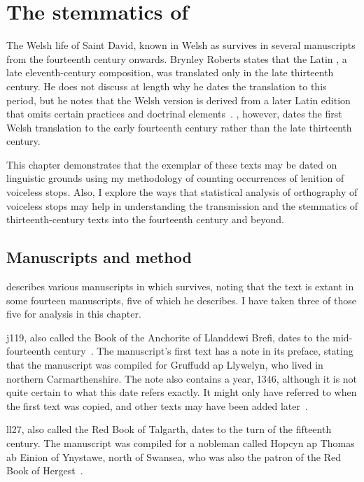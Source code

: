 \chapter{The stemmatics of }
\label{cha:stemm-mwbuch-dewi}
The Welsh life of Saint David, known in Welsh as  survives in several manuscripts from the fourteenth century onwards. Brynley Roberts states that the Latin , a late eleventh-century composition, was translated only in the late thirteenth century. He does not discuss at length why he dates the translation to this period, but he notes that the Welsh version is derived from a later Latin edition that omits certain practices and doctrinal elements~\autocite[218--219]{Rob_Ystoriaeu11}. \Textcite[liv]{Eva_Welsh88}, however, dates the first Welsh translation to the early fourteenth century rather than the late thirteenth century.

This chapter demonstrates that the exemplar of these texts may be dated on linguistic grounds using my methodology of counting occurrences of lenition of voiceless stops. Also, I explore the ways that statistical analysis of  orthography of voiceless stops may help in understanding the transmission and the stemmatics of thirteenth-century texts into the fourteenth century and beyond.



\section{Manuscripts and method}
\label{sec:manuscripts-1}

\Textcite[lv--lviii]{Eva_Welsh88} describes  various manuscripts in which  survives, noting that the text is extant in some fourteen manuscripts,  five of which he describes. I have taken three of those five for analysis in this chapter.

\Acrfull{j119}, also called the Book of the Anchorite of Llanddewi Brefi, dates to the mid-fourteenth century~\autocite[59]{huws_medieval_2000}. The manuscript's first text has a note in its preface, stating that the manuscript was compiled for Gruffudd ap Llywelyn, who lived in northern Carmarthenshire. The note also contains a year, 1346, although it is not quite certain to what this date refers exactly. It might only have referred to when the first text was copied, and other texts may have been added later~\autocite[lvi--lvii]{Eva_Welsh88}.

\Acrfull{ll27}, also called the Red Book of Talgarth, dates to the turn of the fifteenth century. The manuscript was compiled for a nobleman called Hopcyn ap Thomas ab Einion of Ynystawe, north of Swansea, who was also the patron of the Red Book of Hergest~\autocite[lvii]{Eva_Welsh88}.

